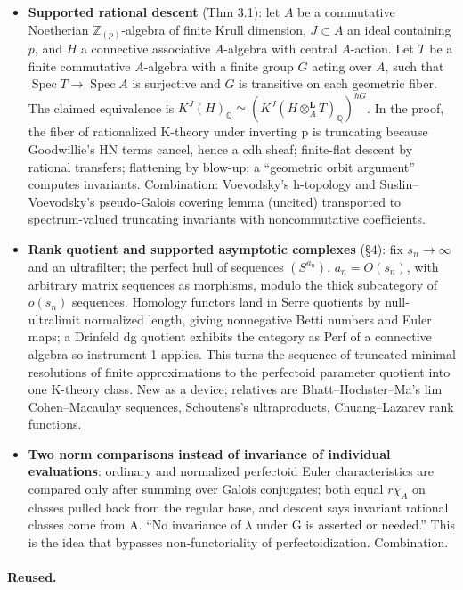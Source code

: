 \documentclass[11pt]{article}
\begin{document}
\begin{itemize}
\item \textbf{Supported rational descent} (Thm 3.1): let $A$ be a commutative Noetherian $\mathbb Z_{(p)}$-algebra of finite Krull dimension, $J\subset A$ an ideal containing $p$, and $H$ a connective associative $A$-algebra with central $A$-action. Let $T$ be a finite commutative $A$-algebra with a finite group $G$ acting over $A$, such that $\operatorname{Spec}T\to\operatorname{Spec}A$ is surjective and $G$ is transitive on each geometric fiber. The claimed equivalence is $K^J(H)_{\mathbb Q}\simeq(K^J(H\otimes_A^{\mathbf L}T)_{\mathbb Q})^{hG}$. In the proof, the fiber of rationalized K-theory under inverting p is truncating because Goodwillie's HN terms cancel, hence a cdh sheaf; finite-flat descent by rational transfers; flattening by blow-up; a ``geometric orbit argument'' computes invariants. Combination: Voevodsky's h-topology and Suslin--Voevodsky's pseudo-Galois covering lemma (uncited) transported to spectrum-valued truncating invariants with noncommutative coefficients.
\item \textbf{Rank quotient and supported asymptotic complexes} (\S{}4): fix $s_n\to\infty$ and an ultrafilter; the perfect hull of sequences $(S^{a_n})$, $a_n=O(s_n)$, with arbitrary matrix sequences as morphisms, modulo the thick subcategory of $o(s_n)$ sequences. Homology functors land in Serre quotients by null-ultralimit normalized length, giving nonnegative Betti numbers and Euler maps; a Drinfeld dg quotient exhibits the category as Perf of a connective algebra so instrument 1 applies. This turns the sequence of truncated minimal resolutions of finite approximations to the perfectoid parameter quotient into one K-theory class. New as a device; relatives are Bhatt--Hochster--Ma's lim Cohen--Macaulay sequences, Schoutens's ultraproducts, Chuang--Lazarev rank functions.
\item \textbf{Two norm comparisons instead of invariance of individual evaluations}: ordinary and normalized perfectoid Euler characteristics are compared only after summing over Galois conjugates; both equal $r\chi_A$ on classes pulled back from the regular base, and descent says invariant rational classes come from A. ``No invariance of $\lambda$ under G is asserted or needed.'' This is the idea that bypasses non-functoriality of perfectoidization. Combination.
\end{itemize}

\paragraph{Reused.}
\end{document}
